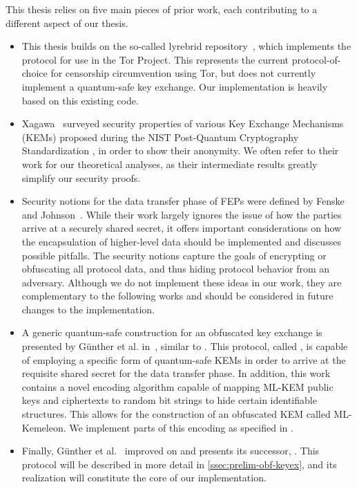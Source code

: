 This thesis relies on five main pieces of prior work, each contributing to a different aspect of our thesis.
\begin{itemize}
    \item This thesis builds on the so-called lyrebrid repository~\cite{lyrebird}, which implements the \obfsfour{} protocol for use in the Tor Project. This represents the current protocol-of-choice for censorship circumvention using Tor, but does not currently implement a quantum-safe key exchange. Our implementation is heavily based on this existing code.

    \item Xagawa~\cite{EC:Xagawa22} surveyed security properties of various Key Exchange Mechanisms (KEMs) proposed during the NIST Post-Quantum Cryptography Standardization \cite{nist-standardization}, in order to show their anonymity. We often refer to their work for our theoretical analyses, as their intermediate results greatly simplify our security proofs.

    \item Security notions for the data transfer phase of FEPs were defined by Fenske and Johnson~\cite{CCS:FenJoh24}. While their work largely ignores the issue of how the parties arrive at a securely shared secret, it offers important considerations on how the encapsulation of higher-level data should be implemented and discusses possible pitfalls. The security notions capture the goals of encrypting or obfuscating all protocol data, and thus hiding protocol behavior from an adversary.
    Although we do not implement these ideas in our work, they are complementary to the following works and should be considered in future changes to the implementation.

    \item A generic quantum-safe construction for an obfuscated key exchange is presented by Günther et al. in~\cite{CCS:GunSteVei24}, similar to \obfsfour{}. This protocol, called \pqobfs{}, is capable of employing a specific form of quantum-safe KEMs in order to arrive at the requisite shared secret for the data transfer phase.
    In addition, this work contains a novel encoding algorithm capable of mapping ML-KEM public keys and ciphertexts to random bit strings to hide certain identifiable structures. This allows for the construction of an obfuscated KEM called ML-Kemeleon. We implement parts of this encoding as specified in \cite{irtf-cfrg-kemeleon-00}. 

    \item Finally, Günther et al.~\cite{EPRINT:GRSV25} improved on \pqobfs{} and presents its successor, \drivel{}. This protocol will be described in more detail in \cref{ssec:prelim-obf-keyex}, and its realization will constitute the core of our implementation.
\end{itemize}

